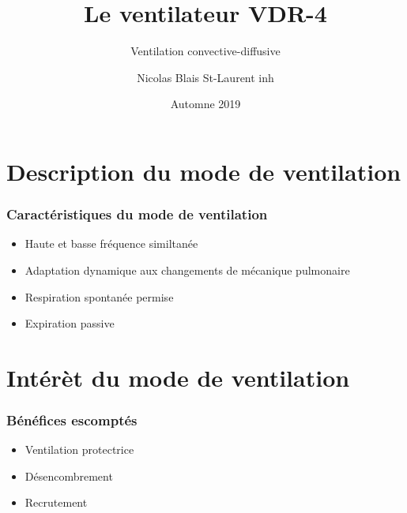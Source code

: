 \documentclass{beamer}
\title{Le ventilateur VDR-4}
\subtitle{Ventilation convective-diffusive}
\author{Nicolas Blais St-Laurent \tiny{inh}}
\date{Automne 2019}
\begin{document}
\begin{frame}
\maketitle
\end{frame}

\begin{frame}
\tableofcontents
\end{frame}

\section{Description du mode de ventilation}

\begin{frame}
	\frametitle{Caractéristiques du mode de ventilation}
	\begin{itemize}
		\item Haute et basse fréquence similtanée
		\item Adaptation dynamique aux changements de mécanique pulmonaire
		\item Respiration spontanée permise
		\item Expiration passive
	\end{itemize}
\end{frame}

\section{Intérèt du mode de ventilation}

\begin{frame}
	\frametitle{Bénéfices escomptés}

	\begin{itemize}
		\item Ventilation protectrice
		\item Désencombrement
		\item Recrutement
	\end{itemize}

\end{frame}
\end{document}
